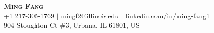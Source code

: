 \documentclass[letterpaper,11pt]{article} %
\begin{document}

% 

\begin{center}
    \textbf{\Huge \scshape Ming Fang} \\ \vspace{1pt} %
    \small 
    +1 217-305-1769 $|$
    \href{mailto:mingf2@illinois.edu}{{mingf2@illinois.edu}} $|$
    \href{{https://www.linkedin.com/in/ming-fang1}}{linkedin.com/in/ming-fang1}\\ \vspace{1pt}
    {904 Stoughton Ct \#3, Urbana, IL 61801, US}
\end{center}
\end{document}
